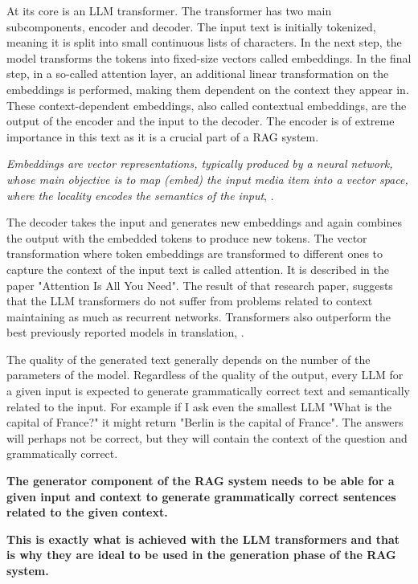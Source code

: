 \documentclass{wseas}
\begin{document}
At its core is an LLM transformer. The
transformer has two main subcomponents, encoder and decoder. The
input text is initially tokenized, meaning it is split into small
continuous lists of characters. In the next step, the model transforms
the tokens into fixed-size vectors called embeddings. In the final step,
in a so-called attention layer, an additional linear transformation on
the embeddings is performed, making them dependent on the context they
appear in. These context-dependent embeddings, also called contextual
embeddings, are the output of the encoder and the input to the decoder.
The encoder is of extreme importance in this text as it is a crucial
part of a RAG system.

\emph{Embeddings are vector representations, typically produced by a
neural network, whose main objective is to map (embed) the input media
item into a vector space, where the locality encodes the semantics of
the input}, \cite{the_faiss_library}.


The decoder takes the input and generates new embeddings and again
combines the output with the embedded tokens to produce new tokens. The
vector transformation where token embeddings are transformed to
different ones to capture the context of the input text is called
attention. It is described in the paper "Attention Is All You Need". 
The result of that research paper, suggests that 
the LLM transformers do not suffer from problems related to context 
maintaining as much as recurrent networks. Transformers also outperform the 
best previously reported models in translation, \cite{attention_is_all_you_need}.

The quality of the generated text generally depends on the number of the
parameters of the model. Regardless of the quality of the output, every
LLM for a given input is expected to generate grammatically correct text
and semantically related to the input. For example if I ask even the
smallest LLM "What is the capital of France?" it might return "Berlin
is the capital of France". The answers will perhaps not be correct, but
they will contain the context of the question and grammatically correct.

\textbf{The generator component of the RAG system needs to be able for
a given input and context to generate grammatically correct sentences
related to the given context.}

\textbf{This is exactly what is achieved with the LLM transformers and
that is why they are ideal to be used in the generation phase of the RAG
system.}
\end{document}
